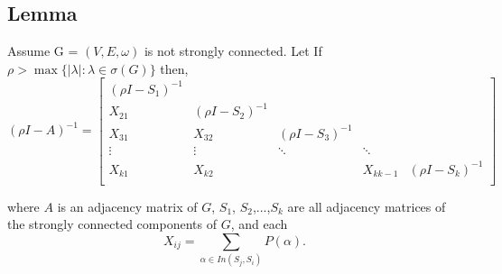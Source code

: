 \documentclass{paper}
\begin{document}
\subsection*{Lemma}
Assume G = $(V,E,\omega)$ is not strongly connected. Let If $\rho > \max\{|\lambda| : \lambda \in \sigma(G)\}$ then,
\[
(\rho I - A)^{-1} = 
\begin{bmatrix}
(\rho I - S_1)^{-1} \\
X_{21} & (\rho I - S_2)^{-1} \\
X_{31} & X_{32} & (\rho I - S_3)^{-1} \\
\vdots & \vdots & \ddots & \ddots \\
X_{k1} & X_{k2} & & X_{kk-1} & (\rho I - S_k)^{-1} \\
\end{bmatrix}
\] 

where $A$ is an adjacency matrix of $G$, 
$S_1$, $S_2$,...,$S_k$ are all adjacency matrices of the strongly connected components of $G$, and each 
\[ X_{ij} = \sum_{\alpha \in In(S_j,S_i)} P(\alpha ). \]
\end{document}
